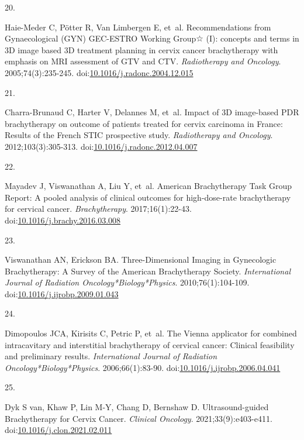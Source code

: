 \documentclass[
  a4paper,
]{scrreprt}
\newlength{\cslhangindent}
\newlength{\csllabelwidth}
\newlength{\cslentryspacingunit} %
\newenvironment{CSLReferences}[2] %
 {%
  \setlength{\parindent}{0pt}
  \ifodd #1
  \let\oldpar\par
  \def\par{\hangindent=\cslhangindent\oldpar}
  \fi
  \setlength{\parskip}{#2\cslentryspacingunit}
 }%
 {}
\newcommand{\CSLLeftMargin}[1]{\parbox[t]{\csllabelwidth}{#1}}
\newcommand{\CSLRightInline}[1]{\parbox[t]{\linewidth - \csllabelwidth}{#1}\break}
\begin{document}
\begin{CSLReferences}{0}{0}
\leavevmode{}%
\CSLLeftMargin{20. }%
\CSLRightInline{Haie-Meder C, Pötter R, Van Limbergen E, et~al.
Recommendations from Gynaecological (GYN) GEC-ESTRO Working Group☆ (I):
concepts and terms in 3D image based 3D treatment planning in cervix
cancer brachytherapy with emphasis on MRI assessment of GTV and CTV.
\emph{Radiotherapy and Oncology}. 2005;74(3):235-245.
doi:\href{https://doi.org/10.1016/j.radonc.2004.12.015}{10.1016/j.radonc.2004.12.015}}

\leavevmode{}%
\CSLLeftMargin{21. }%
\CSLRightInline{Charra-Brunaud C, Harter V, Delannes M, et~al. Impact of
3D image-based PDR brachytherapy on outcome of patients treated for
cervix carcinoma in France: Results of the French STIC prospective
study. \emph{Radiotherapy and Oncology}. 2012;103(3):305-313.
doi:\href{https://doi.org/10.1016/j.radonc.2012.04.007}{10.1016/j.radonc.2012.04.007}}

\leavevmode{}%
\CSLLeftMargin{22. }%
\CSLRightInline{Mayadev J, Viswanathan A, Liu Y, et~al. American
Brachytherapy Task Group Report: A pooled analysis of clinical outcomes
for high-dose-rate brachytherapy for cervical cancer.
\emph{Brachytherapy}. 2017;16(1):22-43.
doi:\href{https://doi.org/10.1016/j.brachy.2016.03.008}{10.1016/j.brachy.2016.03.008}}

\leavevmode{}%
\CSLLeftMargin{23. }%
\CSLRightInline{Viswanathan AN, Erickson BA. Three-Dimensional Imaging
in Gynecologic Brachytherapy: A Survey of the American Brachytherapy
Society. \emph{International Journal of Radiation
Oncology*Biology*Physics}. 2010;76(1):104-109.
doi:\href{https://doi.org/10.1016/j.ijrobp.2009.01.043}{10.1016/j.ijrobp.2009.01.043}}

\leavevmode{}%
\CSLLeftMargin{24. }%
\CSLRightInline{Dimopoulos JCA, Kirisits C, Petric P, et~al. The Vienna
applicator for combined intracavitary and interstitial brachytherapy of
cervical cancer: Clinical feasibility and preliminary results.
\emph{International Journal of Radiation Oncology*Biology*Physics}.
2006;66(1):83-90.
doi:\href{https://doi.org/10.1016/j.ijrobp.2006.04.041}{10.1016/j.ijrobp.2006.04.041}}

\leavevmode{}%
\CSLLeftMargin{25. }%
\CSLRightInline{Dyk S van, Khaw P, Lin M-Y, Chang D, Bernshaw D.
Ultrasound-guided Brachytherapy for Cervix Cancer. \emph{Clinical
Oncology}. 2021;33(9):e403-e411.
doi:\href{https://doi.org/10.1016/j.clon.2021.02.011}{10.1016/j.clon.2021.02.011}}


\end{CSLReferences}
\end{document}
